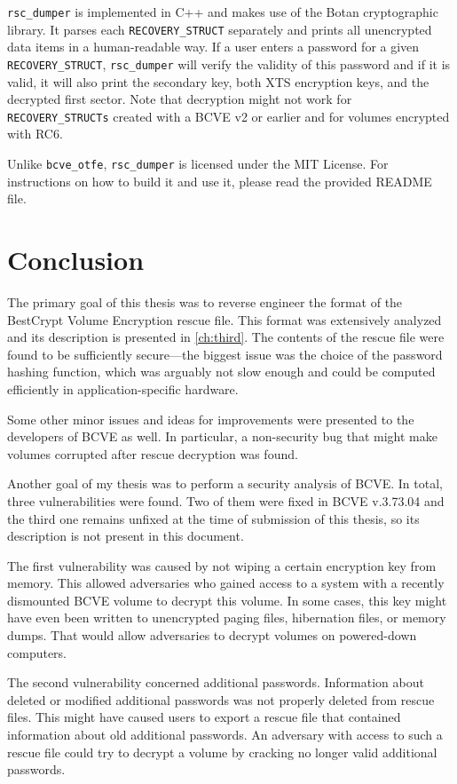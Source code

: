 \documentclass[thesis=B,english]{FITthesis}[2012/10/20]
\begin{document}
	\verb|rsc_dumper| is implemented in C++ and makes use of the Botan cryptographic library. It parses each \verb|RECOVERY_STRUCT| separately and prints all unencrypted data items in a human-readable way. If a user enters a password for a given \verb|RECOVERY_STRUCT|, \verb|rsc_dumper| will verify the validity of this password and if it is valid, it will also print the secondary key, both XTS encryption keys, and the decrypted first sector. Note that decryption might not work for  \verb|RECOVERY_STRUCTs| created with a BCVE v2 or earlier and for volumes encrypted with RC6.
	
	Unlike \verb|bcve_otfe|, \verb|rsc_dumper| is licensed under the MIT License. For instructions on how to build it and use it, please read the provided README file.

	\chapter{Conclusion}
	
	The primary goal of this thesis was to reverse engineer the format of the Be\nolinebreak{}stCrypt Volume Encryption rescue file. This format was extensively analyzed and its description is presented in \cref{ch:third}. The contents of the rescue file were found to be sufficiently secure---the biggest issue was the choice of the password hashing function, which was arguably not slow enough and could be computed efficiently in application-specific hardware. 
	
	Some other minor issues and ideas for improvements were presented to the developers of BCVE as well. In particular, a non-security bug that might make volumes corrupted after rescue decryption was found.
	
	Another goal of my thesis was to perform a security analysis of BCVE. In total, three vulnerabilities were found. Two of them were fixed in BCVE v.3.73.04 and the third one remains unfixed at the time of submission of this thesis, so its description is not present in this document. 
	
	The first vulnerability was caused by not wiping a certain encryption key from memory. This allowed adversaries who gained access to a system with a recently dismounted BCVE volume to decrypt this volume. In some cases, this key might have even been written to unencrypted paging files, hibernation files, or memory dumps. That would allow adversaries to decrypt volumes on powered-down computers.
	
	The second vulnerability concerned additional passwords. Information about deleted or modified additional passwords was not properly deleted from rescue files. This might have caused users to export a rescue file that contained information about old additional passwords. An adversary with access to such a rescue file could try to decrypt a volume by cracking no longer valid additional passwords.
	
\end{document}
